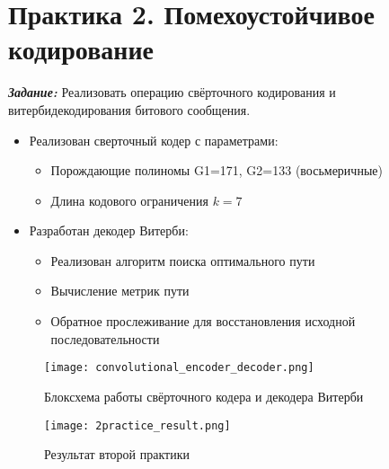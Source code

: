 \chapter*{Практика 2. Помехоустойчивое кодирование}
\label{ch:2_practice}

\textit{\textbf{Задание:}} Реализовать операцию свёрточного кодирования и витербидекодирования битового сообщения.

\begin{itemize}
    \item Реализован сверточный кодер с параметрами:
    \begin{itemize}
        \item Порождающие полиномы G1=171, G2=133 (восьмеричные)
        \item Длина кодового ограничения $k=7$
    \end{itemize}
    \item Разработан декодер Витерби:
    \begin{itemize}
        \item Реализован алгоритм поиска оптимального пути
        \item Вычисление метрик пути
        \item Обратное прослеживание для восстановления исходной последовательности
    \end{itemize}
\end{itemize}

\begin{figure}[ht]
    \centering
    \texttt{[image: convolutional\_encoder\_decoder.png]}
    \caption{Блоксхема работы свёрточного кодера и декодера Витерби}
    \label{fig:convolutional_encoder_decoder}
\end{figure}

\begin{figure}[ht]
    \centering
    \texttt{[image: 2practice\_result.png]}
    \caption{Результат второй практики}
    \label{fig:2practice_result}
\end{figure}